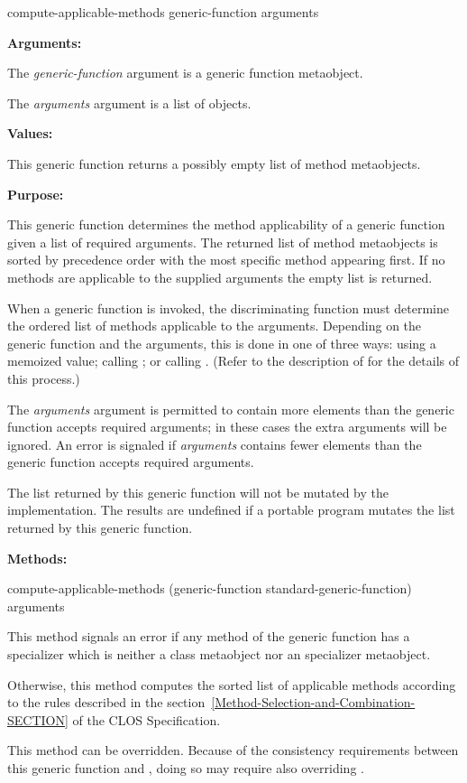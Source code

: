 \begin{defun}
compute-applicable-methods generic-function arguments

\textbf{Arguments:}

The \emph{generic-function} argument is a generic function metaobject.

The \emph{arguments} argument is a list of objects.

\textbf{Values:}

This generic function returns a possibly empty list of method metaobjects.

\textbf{Purpose:}

This generic function determines the method applicability of a generic function
given a list of required arguments. The returned list of method metaobjects is
sorted by precedence order with the most specific method appearing first. If no
methods are applicable to the supplied arguments the empty list is returned.

When a generic function is invoked, the discriminating function must determine
the ordered list of methods applicable to the arguments. Depending on the
generic function and the arguments, this is done in one of three ways: using a
memoized value; calling ; or calling
. (Refer to the description of
 for the details of this process.)

The \emph{arguments} argument is permitted to contain more elements than the generic
function accepts required arguments; in these cases the extra arguments will be
ignored. An error is signaled if \emph{arguments} contains fewer elements than the
generic function accepts required arguments.

The list returned by this generic function will not be mutated by the
implementation. The results are undefined if a portable program mutates the list
returned by this generic function.

\textbf{Methods:}

\begin{defun}
compute-applicable-methods (generic-function standard-generic-function) arguments

This method signals an error if any method of the generic function has a
specializer which is neither a class metaobject nor an  specializer
metaobject.

Otherwise, this method computes the sorted list of applicable methods according
to the rules described in the
section~\ref{Method-Selection-and-Combination-SECTION} of the CLOS
Specification.

This method can be overridden. Because of the consistency requirements between
this generic function and , doing so may
require also overriding .
\end{defun}
\end{defun}

